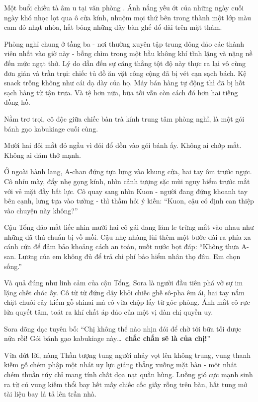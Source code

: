 \documentclass[../main.tex]{subfiles}
\begin{document}
\color{black}

Một buổi chiều tà âm u tại văn phòng \hll. Ánh nắng yếu ớt của những ngày cuối ngày khó nhọc lọt qua ô cửa kính, nhuộm mọi thứ bên trong thành một lớp màu cam đỏ nhạt nhòa, hắt bóng những dãy bàn ghế đổ dài trên mặt thảm.

Phòng nghỉ chung ở tầng ba - nơi thường xuyên tập trung đông đảo các thành viên nhất vào giờ này - bỗng chìm trong một bầu không khí tĩnh lặng và nặng nề đến mức ngạt thở. Lý do dẫn đến sự căng thẳng tột độ này thực ra lại vô cùng đơn giản và trần trụi: chiếc tủ đồ ăn vặt công cộng đã bị vét cạn sạch bách. Kệ snack trống không như cái dạ dày của họ. Máy bán hàng tự động thì đã bị hốt sạch hàng từ tận trưa. Và tệ hơn nữa, bữa tối vẫn còn cách đó hơn hai tiếng đồng hồ.

Nằm trơ trọi, cô độc giữa chiếc bàn trà kính trung tâm phòng nghỉ, là một gói bánh gạo kabukiage cuối cùng.

Mười hai đôi mắt đỏ ngầu vì đói đổ dồn vào gói bánh ấy. Không ai chớp mắt. Không ai dám thở mạnh.

Ở ngoài hành lang, A-chan đứng tựa lưng vào khung cửa, hai tay ôm trước ngực. Cô nhíu mày, đẩy nhẹ gọng kính, nhìn cảnh tượng sặc mùi nguy hiểm trước mắt với vẻ mặt đầy bất lực. Cô quay sang nhìn Kuon - người đang đứng khoanh tay bên cạnh, lưng tựa vào tường - thì thầm hỏi ý kiến:
``Kuon, cậu có định can thiệp vào chuyện này không?''

Cậu Tổng đảo mắt liếc nhìn mười hai cô gái đang lăm le trừng mắt vào nhau như những dã thú chuẩn bị vồ mồi. Cậu nhẹ nhàng lùi thêm một bước dài ra phía xa cánh cửa để đảm bảo khoảng cách an toàn, nuốt nước bọt đáp:
``Không thưa A-san. Lương của em không đủ để trả chi phí bảo hiểm nhân thọ đâu. Em chọn sống.''

Và quả đúng như linh cảm của cậu Tổng, Sora là người đầu tiên phá vỡ sự im lặng chết chóc ấy. Cô từ từ đứng dậy khỏi chiếc ghế sô-pha êm ái, hai tay nắm chặt chuôi cây kiếm gỗ shinai mà cô vừa chộp lấy từ góc phòng. Ánh mắt cô rực lửa quyết tâm, toát ra khí chất áp đảo của một vị đàn chị quyền uy.

Sora dõng dạc tuyên bố:
``Chị không thể nào nhịn đói để chờ tới bữa tối được nữa rồi! Gói bánh gạo kabukiage này\dots\ \textbf{chắc chắn sẽ là của chị!}''

Vừa dứt lời, nàng Thần tượng tung người nhảy vọt lên không trung, vung thanh kiếm gỗ chém phập một nhát uy lực giáng thẳng xuống mặt bàn - một nhát chém thuần túy chỉ mang tính chất dọa nạt quần hùng. Luồng gió cực mạnh sinh ra từ cú vung kiếm thổi bay hết mấy chiếc cốc giấy rỗng trên bàn, hất tung mớ tài liệu bay lả tả lên trần nhà.
\end{document}
